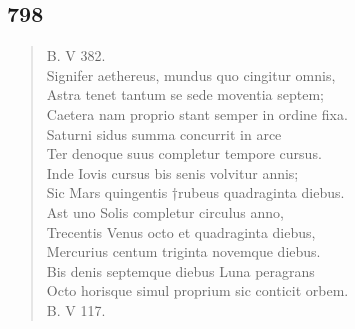 \documentclass[11pt, a4paper]{report}
\begin{document}
            \subsection*{798}
      \begin{verse}
      B. V 382. \\ Signifer aethereus, mundus quo cingitur omnis, \\ Astra tenet tantum se sede moventia septem; \\ Caetera nam proprio stant semper in ordine fixa. \\ Saturni sidus summa concurrit in arce \\ Ter denoque suus completur tempore cursus. \\ Inde Iovis cursus bis senis volvitur annis; \\ Sic Mars quingentis †rubeus quadraginta diebus. \\ Ast uno Solis completur circulus anno, \\ Trecentis Venus octo et quadraginta diebus, \\ Mercurius centum triginta novemque diebus. \\ Bis denis septemque diebus Luna peragrans \\ Octo horisque simul proprium sic conticit orbem. \\ B. V 117. \\ 
      \end{verse}
  
\end{document}

